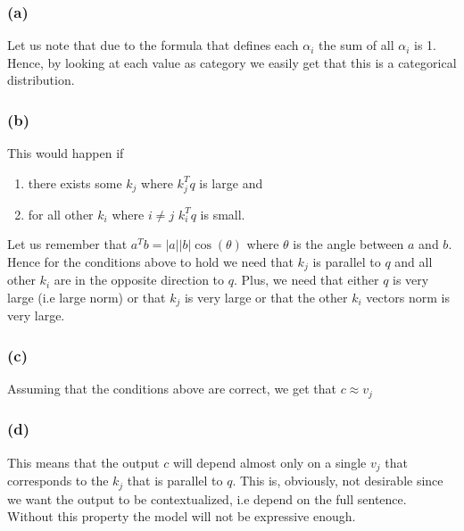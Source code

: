 \subsubsection*{(a)}
Let us note that due to the formula that defines each $\alpha_i$ the sum of all $\alpha_i$ is 1. 
Hence, by looking at each value as category we easily get that this is a categorical distribution. \newline
\subsubsection*{(b)}
This would happen if 
\begin{enumerate}
    \item there exists some $k_j$ where $k_j^Tq$ is large and
    \item for all other $k_i$ where $i \neq j$ $k_i^Tq$ is small.
\end{enumerate} 
Let us remember that $a^Tb = |a||b|\cos(\theta)$ where $\theta$ is the angle between $a$ and $b$. Hence for the conditions above to hold we need that $k_j$ is parallel to $q$ and all other $k_i$ are in the opposite direction to $q$. \newline
Plus, we need that either $q$ is very large (i.e large norm) or that $k_j$ is very large or that the other $k_i$ vectors norm is very large. \newline
\subsubsection*{(c)}
Assuming that the conditions above are correct, we get that $c \approx v_j$ \newline
\subsubsection*{(d)}
This means that the output $c$ will depend almost only on a single $v_j$ that corresponds to the $k_j$ that is parallel to $q$. 
This is, obviously, not desirable since we want the output to be contextualized, i.e depend on the full sentence. Without this property the model will not be expressive enough.